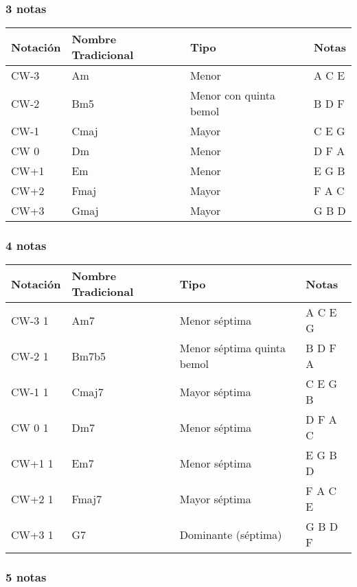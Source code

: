 \documentclass[]{report}
\begin{document}
\subsubsection*{3 notas}

\begin{table}[H]
  \centering
  \begin{tabularx}{\textwidth}{ll>{\raggedright\arraybackslash}Xl}
\toprule
Notación & Nombre Tradicional & Tipo & Notas \\
\midrule
\textsf{CW-3} & Am      & Menor & A C E \\
\textsf{CW-2} & Bm5     & Menor con quinta bemol & B D F \\
\textsf{CW-1} & Cmaj    & Mayor & C E G \\
\textsf{CW 0} & Dm      & Menor & D F A \\
\textsf{CW+1} & Em      & Menor & E G B \\
\textsf{CW+2} & Fmaj    & Mayor & F A C \\
\textsf{CW+3} & Gmaj    & Mayor & G B D \\ 
\bottomrule
\end{tabularx}
\end{table}
\subsubsection*{4 notas}

\begin{table}[H]
  \centering
  \begin{tabularx}{\textwidth}{ll>{\raggedright\arraybackslash}Xl}
\toprule
Notación & Nombre Tradicional & Tipo & Notas \\
\midrule
\textsf{CW-3} 1 & Am7     & Menor séptima & A C E G \\
\textsf{CW-2} 1 & Bm7b5   & Menor séptima quinta bemol & B D F A \\
\textsf{CW-1} 1 & Cmaj7   & Mayor séptima & C E G B \\
\textsf{CW 0} 1 & Dm7     & Menor séptima & D F A C \\
\textsf{CW+1} 1 & Em7     & Menor séptima & E G B D \\
\textsf{CW+2} 1 & Fmaj7   & Mayor séptima & F A C E \\
\textsf{CW+3} 1 & G7      & Dominante (séptima) & G B D F \\
\bottomrule
\end{tabularx}
\end{table}

\subsubsection*{5 notas}
\end{document}

